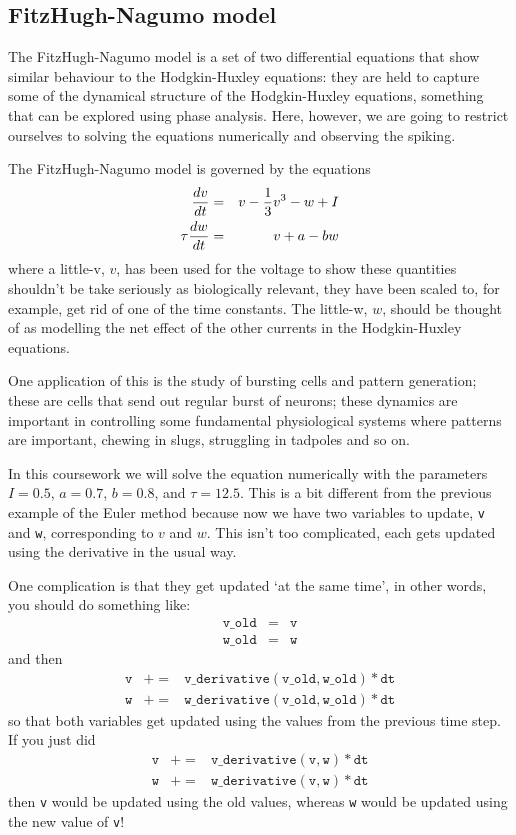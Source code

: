 \documentclass[12pt]{article}
\begin{document}
\subsection*{FitzHugh-Nagumo model}

The FitzHugh-Nagumo model \cite{FitzHugh1955,Nagumo1962} is a set of
two differential equations that show similar behaviour to the
Hodgkin-Huxley equations: they are held to capture some of the
dynamical structure of the Hodgkin-Huxley equations, something that
can be explored using phase analysis. Here, however, we are going to
restrict ourselves to solving the equations numerically and observing
the spiking.

The FitzHugh-Nagumo model is governed by the equations
\begin{eqnarray}
\frac{dv}{dt}&=&v-\frac{1}{3}v^3-w+I\cr
\tau\frac{dw}{dt}&=&v+a-bw
\end{eqnarray}
where a little-v, $v$, has been used for the voltage to show these
quantities shouldn't be take seriously as biologically relevant, they
have been scaled to, for example, get rid of one of the time
constants. The little-w, $w$, should be thought of as modelling the
net effect of the other currents in the Hodgkin-Huxley equations.

One application of this is the study of bursting cells and pattern
generation; these are cells that send out regular burst of neurons;
these dynamics are important in controlling some fundamental
physiological systems where patterns are important, chewing in slugs,
struggling in tadpoles and so on.

In this coursework we will solve the equation numerically with the
parameters $I=0.5$, $a=0.7$, $b=0.8$, and $\tau=12.5$. This is a bit
different from the previous example of the Euler method because now we
have two variables to update, \texttt{v} and \texttt{w}, corresponding
to $v$ and $w$. This isn't too complicated, each gets updated using
the derivative in the usual way.

One complication is that they get
updated `at the same time', in other words, you should do something like:
\begin{eqnarray*}
  \mathtt{v\_old}&=&\mathtt{v}\\
  \mathtt{w\_old}&=&\mathtt{w}
\end{eqnarray*}
and then
\begin{eqnarray*}
  \mathtt{v}&+=&\mathtt{v\_derivative(v\_old,w\_old)*dt}\\
  \mathtt{w}&+=&\mathtt{w\_derivative(v\_old,w\_old)*dt}
\end{eqnarray*}
so that both variables get updated using the values from the previous time step. If you just did
\begin{eqnarray*}
  \mathtt{v}&+=&\mathtt{v\_derivative(v,w)*dt}\\
  \mathtt{w}&+=&\mathtt{w\_derivative(v,w)*dt}
\end{eqnarray*}
then \texttt{v} would be updated using the old values, whereas \texttt{w} would be updated using the new value of \texttt{v}!
\end{document}

